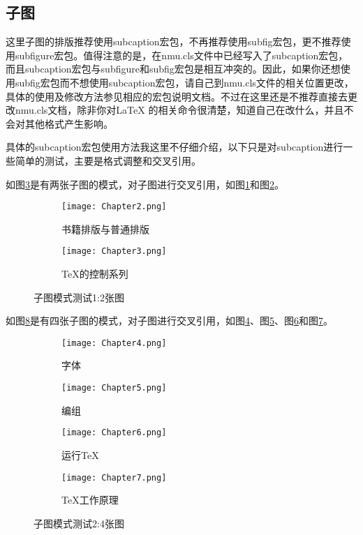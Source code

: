 \subsection{子图}
这里子图的排版推荐使用subcaption宏包，不再推荐使用subfig宏包，更不推荐使用subfigure宏包。值得注意的是，在nmu.cls文件中已经写入了subcaption宏包，而且subcaption宏包与subfigure和subfig宏包是相互冲突的。因此，如果你还想使用subfig宏包而不想使用subcaption宏包，请自己到nmu.cls文件的相关位置更改，具体的使用及修改方法参见相应的宏包说明文档。不过在这里还是不推荐直接去更改nmu.cls文档，除非你对\LaTeX{} 的相关命令很清楚，知道自己在改什么，并且不会对其他格式产生影响。

具体的subcaption宏包使用方法我这里不仔细介绍，以下只是对subcaption进行一些简单的测试，主要是格式调整和交叉引用。

如图\ref{fig:subfig_test1}是有两张子图的模式，对子图进行交叉引用，如图\ref{subfig:1a}和图\ref{subfig:1b}。

\begin{figure}[htbp]
	\centering
	\begin{subfigure}[b]{.4\textwidth}
		\centering
		\texttt{[image: Chapter2.png]}
		\caption{书籍排版与普通排版}\label{subfig:1a}
	\end{subfigure}
	\quad
	\begin{subfigure}[b]{.4\textwidth}
		\centering
		\texttt{[image: Chapter3.png]}
		\caption{\TeX 的控制系列}\label{subfig:1b}
	\end{subfigure}
	\caption{子图模式测试1:2张图}\label{fig:subfig_test1}
\end{figure}

如图\ref{fig:subfig_test2}是有四张子图的模式，对子图进行交叉引用，如图\ref{subfig:2a}、图\ref{subfig:2b}、图\ref{subfig:2c}和图\ref{subfig:2d}。

\begin{figure}[htbp]
	\centering
	\begin{subfigure}[b]{.4\textwidth}
		\centering
		\texttt{[image: Chapter4.png]}
		\caption{字体}\label{subfig:2a}
	\end{subfigure}
	\begin{subfigure}[b]{.4\textwidth}
		\centering
		\texttt{[image: Chapter5.png]}
		\caption{编组}\label{subfig:2b}
	\end{subfigure}
	\begin{subfigure}[b]{.4\textwidth}
		\centering
		\texttt{[image: Chapter6.png]}
		\caption{运行\TeX}\label{subfig:2c}
	\end{subfigure}
	\begin{subfigure}[b]{.4\textwidth}
		\centering
		\texttt{[image: Chapter7.png]}
		\caption{\TeX 工作原理}\label{subfig:2d}
	\end{subfigure}
	\caption{子图模式测试2:4张图}\label{fig:subfig_test2}
\end{figure}

